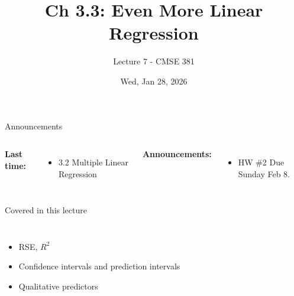 \documentclass[aspectratio=169,usenames,dvipsnames]{beamer}
\begin{document}
\title[]{Ch 3.3: Even More Linear Regression}
\subtitle{Lecture 7 - CMSE 381}
\date{Wed, Jan 28, 2026}





\begin{frame}
 \titlepage


\end{frame}
\begin{frame}[c]{Announcements}

\begin{columns}
\centering

	\textbf{Last time:}
	\begin{itemize}
		\item 3.2 Multiple Linear Regression
	\end{itemize}
\centering

\textbf{Announcements:}
	\begin{itemize}
		\item HW \#2 Due Sunday Feb 8.
	\end{itemize}
\end{columns}

\end{frame}
\begin{frame}[c]{Covered in this lecture }

\begin{columns}
\centering
\begin{itemize}
	\item RSE, $R^2$
	\item Confidence intervals and prediction intervals
	\item Qualitative predictors
\end{itemize}
\centering

\end{columns}

\end{frame}
\end{document}

